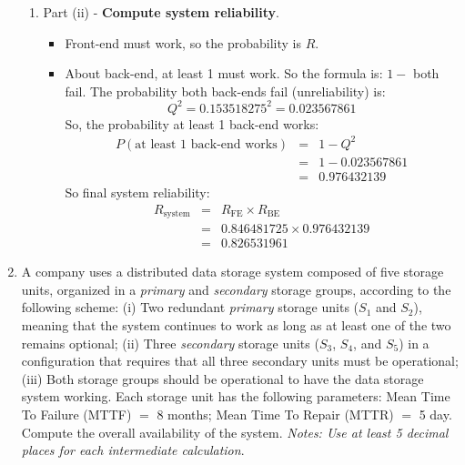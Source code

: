 \begin{enumerate}
\begin{enumerate}
        \item Part (ii) - \textbf{Compute system reliability}.
        \begin{itemize}
            \item Front-end must work, so the probability is $R$.
            \item About back-end, at least 1 must work. So the formula is: $ 1 -$ both fail. The probability both back-ends fail (unreliability) is:
            \begin{equation*}
                Q^2 = 0.153518275^2 = 0.023567861
            \end{equation*}
            So, the probability at least 1 back-end works:
            \begin{equation*}
                \begin{array}{rcl}
                    P(\text{at least 1 back-end works}) &=& 1 - Q^2 \\ [.3em]
                    &=& 1 - 0.023567861 \\ [.3em]
                    &=& 0.976432139
                \end{array}
            \end{equation*}
            So final system reliability:
            \begin{equation*}
                \begin{array}{rcl}
                    R_{\text{system}} &=& R_{\text{FE}} \times R_{\text{BE}} \\ [.3em]
                    &=& 0.846481725 \times 0.976432139 \\ [.3em]
                    &=& \mathbf{0.8265}31961
                \end{array}
            \end{equation*}
        \end{itemize}
    \end{enumerate}

    \newpage

    \item A company uses a distributed data storage system composed of five storage units, organized in a \emph{primary} and \emph{secondary} storage groups, according to the following scheme: (i) Two redundant \emph{primary} storage units ($S_1$ and $S_2$), meaning that the system continues to work as long as at least one of the two remains optional; (ii) Three \emph{secondary} storage units ($S_3$, $S_4$, and $S_5$) in a configuration that requires that all three secondary units must be operational; (iii) Both storage groups should be operational to have the data storage system working. Each storage unit has the following parameters: Mean Time To Failure (MTTF) $=$ 8 months; Mean Time To Repair (MTTR) $=$ 5 day. Compute the overall availability of the system. \emph{Notes: Use at least 5 decimal places for each intermediate calculation}.


\end{enumerate}

